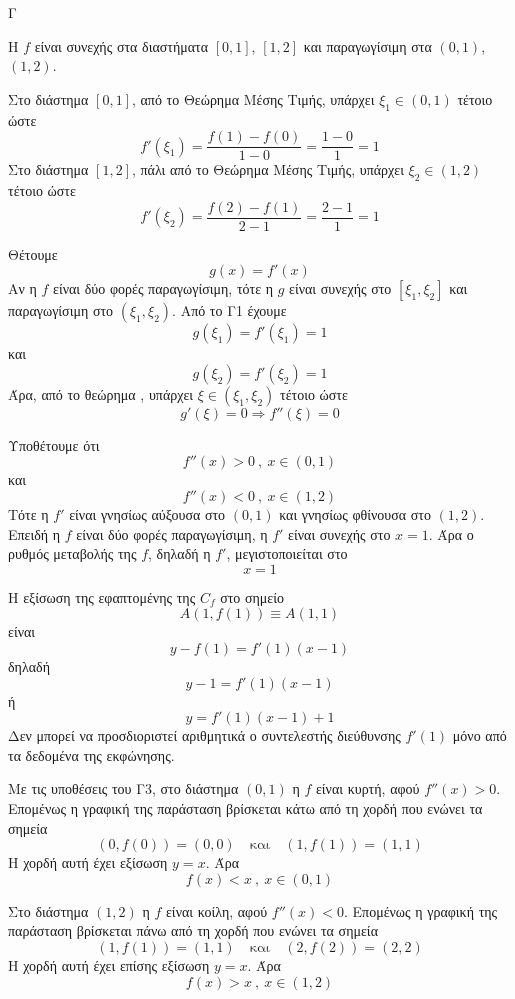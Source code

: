 \begin{thema}{Γ}
\begin{erwthma}
\item Η $f$ είναι συνεχής στα διαστήματα $[0,1]$, $[1,2]$ και παραγωγίσιμη στα $(0,1)$, $(1,2)$.

Στο διάστημα $[0,1]$, από το Θεώρημα Μέσης Τιμής, υπάρχει $\xi_1\in(0,1)$ τέτοιο ώστε
\[f'(\xi_1)=\frac{f(1)-f(0)}{1-0}=\frac{1-0}{1}=1\]
Στο διάστημα $[1,2]$, πάλι από το Θεώρημα Μέσης Τιμής, υπάρχει $\xi_2\in(1,2)$ τέτοιο ώστε
\[f'(\xi_2)=\frac{f(2)-f(1)}{2-1}=\frac{2-1}{1}=1\]

\item Θέτουμε
\[g(x)=f'(x)\]
Αν η $f$ είναι δύο φορές παραγωγίσιμη, τότε η $g$ είναι συνεχής στο $[\xi_1,\xi_2]$ και παραγωγίσιμη στο $(\xi_1,\xi_2)$.
Από το Γ1 έχουμε
\[g(\xi_1)=f'(\xi_1)=1\]
και
\[g(\xi_2)=f'(\xi_2)=1\]
Άρα, από το θεώρημα , υπάρχει $\xi\in(\xi_1,\xi_2)$ τέτοιο ώστε
\[g'(\xi)=0\Rightarrow f''(\xi)=0\]

\item Υποθέτουμε ότι
\[f''(x)>0\ ,\ x\in(0,1)\]
και
\[f''(x)<0\ ,\ x\in(1,2)\]
Τότε η $f'$ είναι γνησίως αύξουσα στο $(0,1)$ και γνησίως φθίνουσα στο $(1,2)$.
Επειδή η $f$ είναι δύο φορές παραγωγίσιμη, η $f'$ είναι συνεχής στο $x=1$.
Άρα ο ρυθμός μεταβολής της $f$, δηλαδή η $f'$, μεγιστοποιείται στο
\[x=1\]

\item Η εξίσωση της εφαπτομένης της $C_f$ στο σημείο
\[A(1,f(1))\equiv A(1,1)\]
είναι
\[y-f(1)=f'(1)(x-1)\]
δηλαδή
\[y-1=f'(1)(x-1)\]
ή
\[y=f'(1)(x-1)+1\]
Δεν μπορεί να προσδιοριστεί αριθμητικά ο συντελεστής διεύθυνσης $f'(1)$ μόνο από τα δεδομένα της εκφώνησης.

Με τις υποθέσεις του Γ3, στο διάστημα $(0,1)$ η $f$ είναι κυρτή, αφού $f''(x)>0$.
Επομένως η γραφική της παράσταση βρίσκεται κάτω από τη χορδή που ενώνει τα σημεία
\[(0,f(0))=(0,0)\quad\text{και}\quad (1,f(1))=(1,1)\]
Η χορδή αυτή έχει εξίσωση $y=x$. Άρα
\[f(x)<x\ ,\ x\in(0,1)\]

Στο διάστημα $(1,2)$ η $f$ είναι κοίλη, αφού $f''(x)<0$.
Επομένως η γραφική της παράσταση βρίσκεται πάνω από τη χορδή που ενώνει τα σημεία
\[(1,f(1))=(1,1)\quad\text{και}\quad (2,f(2))=(2,2)\]
Η χορδή αυτή έχει επίσης εξίσωση $y=x$. Άρα
\[f(x)>x\ ,\ x\in(1,2)\]

\end{erwthma}
\end{thema}

